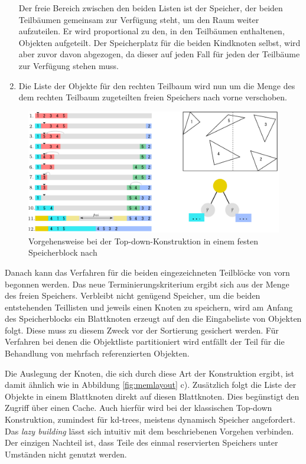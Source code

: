 \begin{enumerate}
 Der freie Bereich zwischen den beiden Listen ist der Speicher, der beiden Teilbäumen gemeinsam zur Verfügung steht, um den Raum weiter aufzuteilen. Er wird proportional zu den, in den Teilbäumen enthaltenen, Objekten aufgeteilt. 
Der Speicherplatz für die beiden Kindknoten selbst, wird aber zuvor davon abgezogen, da dieser auf jeden Fall für jeden der Teilbäume zur Verfügung stehen muss.
 \item Die Liste der Objekte für den rechten Teilbaum wird nun um die Menge des dem rechten Teilbaum zugeteilten freien Speichers nach vorne verschoben.
\end{enumerate}
\begin{figure}\centering
\includegraphics[width=1.0\textwidth]{images/memrt.pdf} 
\caption[Konstruktion eines Binärbaums im einem begrenzten Speicherblock]{Vorgehensweise bei der Top-down-Konstruktion in einem festen Speicherblock nach \cite{WK07}}
\label{fig:memrt}
\end{figure}

Danach kann das Verfahren für die beiden eingezeichneten Teilblöcke von vorn begonnen werden. Das neue Terminierungskriterium ergibt sich aus der Menge des freien Speichers. Verbleibt nicht genügend Speicher, um die beiden entstehenden Teillisten und jeweils einen Knoten zu speichern, wird am Anfang des Speicherblocks ein Blattknoten erzeugt auf den die Eingabeliste von Objekten folgt. Diese muss zu diesem Zweck vor der Sortierung gesichert werden.
Für Verfahren bei denen die Objektliste partitioniert wird entfällt der Teil für die Behandlung von mehrfach referenzierten Objekten.

Die Auslegung der Knoten, die sich durch diese Art der Konstruktion ergibt, ist damit ähnlich wie in Abbildung \ref{fig:memlayout} c). Zusätzlich folgt die Liste der Objekte in einem Blattknoten direkt auf diesen Blattknoten. Dies begünstigt den Zugriff über einen Cache. Auch hierfür wird bei der klassischen Top-down Konstruktion, zumindest für kd-trees, meistens dynamisch Speicher angefordert.
Das \textit{lazy building} lässt sich intuitiv mit dem beschriebenen Vorgehen verbinden. Der einzigen Nachteil ist, dass Teile des einmal reservierten Speichers unter Umständen nicht genutzt werden.

